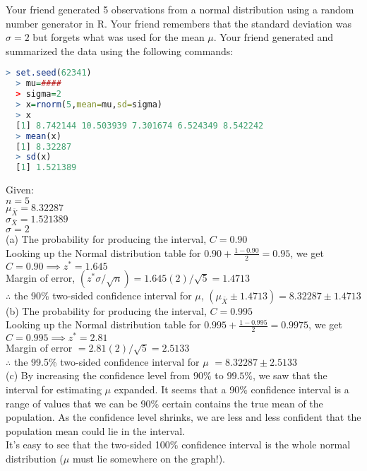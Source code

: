 \documentclass[boxes, qed]{homework}
\begin{document}
\begin{problem}Your friend generated 5 observations from a normal distribution using a random number
  generator in R. Your friend remembers that the standard deviation was $\sigma=2$ but forgets 
  what was used for the mean $\mu$. Your friend generated and summarized the data using the following commands:
  \begin{lstlisting}[backgroundcolor = \color{lightgray},language = R]
  > set.seed(62341)
  > mu=####
  > sigma=2
  > x=rnorm(5,mean=mu,sd=sigma)
  > x
  [1] 8.742144 10.503939 7.301674 6.524349 8.542242
  > mean(x)
  [1] 8.32287
  > sd(x)
  [1] 1.521389
  \end{lstlisting}
\end{problem}
\begin{solution}
  Given:\\
  $n=5$\\
  $\mu_{\bar{X}}=8.32287$\\
  $\sigma_{\bar{X}}=1.521389$\\
  $\sigma=2$\\

  (a) The probability for producing the interval, $C=0.90$\\
  Looking up the Normal distribution table
  for $0.90+\frac{1-0.90}{2}=0.95$, we get
  $C=0.90 \implies z^*=1.645$\\
  Margin of error, $(z^*\sigma/\sqrt{n}) = 1.645(2)/\sqrt{5} = 1.4713$\\

  $\therefore$ the 90\% two-sided confidence interval for $\mu$, 
  $(\mu_{\bar{X}}\pm{1.4713})=\boxed{8.32287\pm{1.4713}}$\\

  (b) The probability for producing the interval, $C=0.995$\\
  Looking up the Normal distribution table
  for $0.995+\frac{1-0.995}{2}=0.9975$, we get
  $C=0.995 \implies z^*=2.81$\\
  Margin of error $= 2.81(2)/\sqrt{5} = 2.5133$\\

  $\therefore$ the 99.5\% two-sided confidence interval for $\mu$
  $=\boxed{8.32287\pm{2.5133}}$\\

  (c) By increasing the confidence level from $90\%$ to $99.5\%$, 
  we saw that the interval for estimating $\mu$ expanded. It seems
  that a 90\% confidence interval is a range of values that we can be 90\% 
  certain contains the true mean of the population. As the confidence level
  shrinks, we are less and less confident that the population mean
  could lie in the interval.\\

  It's easy to see that the two-sided 100\% confidence interval
  is the whole normal distribution ($\mu$ must lie somewhere on the graph!).
\end{solution}
\end{document}
